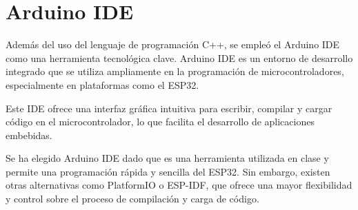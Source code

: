 \section{Arduino IDE}

Además del uso del lenguaje de programación C++, se empleó el Arduino IDE como una herramienta tecnológica clave. Arduino IDE es un entorno de desarrollo integrado que se utiliza ampliamente en la programación de microcontroladores, especialmente en plataformas como el ESP32. 

Este IDE ofrece una interfaz gráfica intuitiva para escribir, compilar y cargar código en el microcontrolador, lo que facilita el desarrollo de aplicaciones embebidas.

Se ha elegido Arduino IDE dado que es una herramienta utilizada en clase y permite una programación rápida y sencilla del ESP32. Sin embargo, existen otras alternativas como PlatformIO o ESP-IDF, que ofrece una mayor flexibilidad y control sobre el proceso de compilación y carga de código.